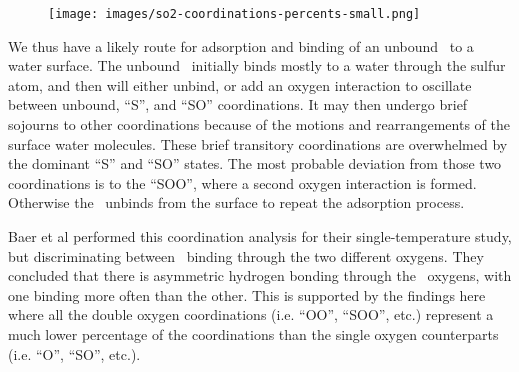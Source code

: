 \begin{figure}[h!]
	\begin{center}
		\texttt{[image: images/so2-coordinations-percents-small.png]}
		\caption{}
		\label{fig:bonding-coordinations}
	\end{center}
\end{figure}

We thus have a likely route for adsorption and binding of an unbound \suldiox~to a water surface. The unbound \suldiox~initially binds mostly to a water through the sulfur atom, and then will either unbind, or add an oxygen interaction to oscillate between unbound, ``S'', and ``SO'' coordinations. It may then undergo brief sojourns to other coordinations because of the motions and rearrangements of the surface water molecules. These brief transitory coordinations are overwhelmed by the dominant ``S'' and ``SO'' states. The most probable deviation from those two coordinations is to the ``SOO'', where a second oxygen interaction is formed. Otherwise the \suldiox~unbinds from the surface to repeat the adsorption process.

Baer et al performed this coordination analysis for their single-temperature study, but discriminating between \suldiox~binding through the two different oxygens. They concluded that there is asymmetric hydrogen bonding through the \suldiox~oxygens, with one binding more often than the other. This is supported by the findings here where all the double oxygen coordinations (i.e. ``OO'', ``SOO'', etc.) represent a much lower percentage of the coordinations than the single oxygen counterparts (i.e. ``O'', ``SO'', etc.). 


